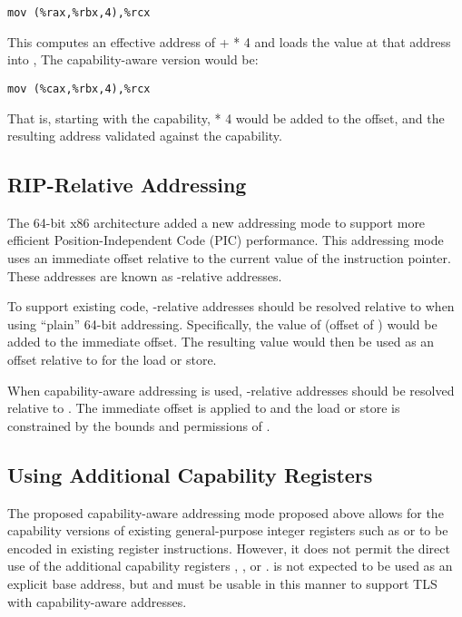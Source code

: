 \begin{verbatim}
mov (%rax,%rbx,4),%rcx
\end{verbatim}

This computes an effective address of \RAX{} + \RBX{} * 4 and loads the value
at that address into \RCX{},  The capability-aware version would be:

\begin{verbatim}
mov (%cax,%rbx,4),%rcx
\end{verbatim}

That is, starting with the \CAX{} capability, \RBX{} * 4 would be added to the
offset, and the resulting address validated against the \CAX{} capability.

\subsection{RIP-Relative Addressing}

The 64-bit x86 architecture added a new addressing mode to support more
efficient Position-Independent Code (PIC) performance.
This addressing mode uses an immediate offset
relative to the current value of the instruction
pointer.  These addresses are known as \RIP{}-relative addresses.

To support existing code, \RIP{}-relative addresses should be resolved
relative to \DDC{} when using ``plain'' 64-bit addressing.
Specifically, the value of \RIP{} (offset of \CIP{}) would be added to
the immediate offset.  The resulting value would then be used as an
offset relative to \DDC{} for the load or store.

When capability-aware addressing is used, \RIP{}-relative addresses
should be resolved relative to \CIP{}.
The immediate offset is applied to \CIP{} and the load
or store is constrained by the bounds and permissions of \CIP{}.

\subsection{Using Additional Capability Registers}
\label{sec:x86:using-additional-caps}

The proposed capability-aware addressing mode proposed above allows
for the capability versions of existing general-purpose integer registers such
as \CAX{} or \CBP{} to be encoded in existing register instructions.
However, it does not permit the direct use of the additional
capability registers \DDC{}, \CFS{}, or \CGS{}.  \DDC{} is not expected to be
used as an explicit base address, but \CFS{} and \CGS{} must be usable in this
manner to support TLS with capability-aware addresses.


